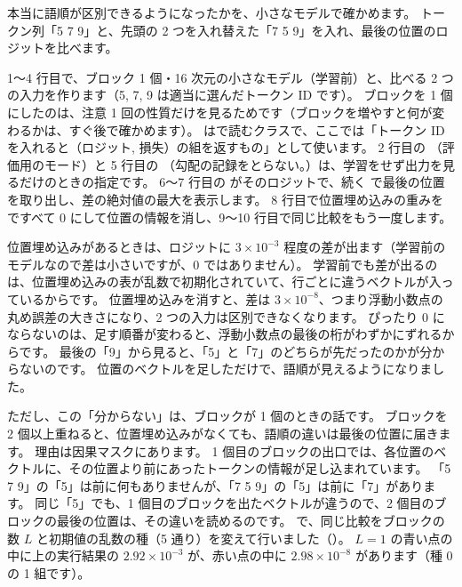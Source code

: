 本当に語順が区別できるようになったかを、小さなモデルで確かめます。
トークン列「5 7 9」と、先頭の 2 つを入れ替えた「7 5 9」を入れ、最後の位置のロジットを比べます。


1〜4 行目で、ブロック 1 個・16 次元の小さなモデル（学習前）と、比べる 2 つの入力を作ります（5, 7, 9 は適当に選んだトークン ID です）。
ブロックを 1 個にしたのは、注意 1 回の性質だけを見るためです（ブロックを増やすと何が変わるかは、すぐ後で確かめます）。
 はで読むクラスで、ここでは「トークン ID を入れると（ロジット, 損失）の組を返すもの」として使います。
2 行目の （評価用のモード）と 5 行目の （勾配の記録をとらない。）は、学習をせず出力を見るだけのときの指定です。
6〜7 行目の  がそのロジットで、続く \code{[0, -1]} で最後の位置を取り出し、差の絶対値の最大を表示します。
8 行目で位置埋め込みの重みを  ですべて 0 にして位置の情報を消し、9〜10 行目で同じ比較をもう一度します。


位置埋め込みがあるときは、ロジットに $3\times10^{-3}$ 程度の差が出ます（学習前のモデルなので差は小さいですが、0 ではありません）。
学習前でも差が出るのは、位置埋め込みの表が乱数で初期化されていて、行ごとに違うベクトルが入っているからです。
位置埋め込みを消すと、差は $3\times 10^{-8}$、つまり浮動小数点の丸め誤差の大きさになり、2 つの入力は区別できなくなります。
ぴったり 0 にならないのは、足す順番が変わると、浮動小数点の最後の桁がわずかにずれるからです。
最後の「9」から見ると、「5」と「7」のどちらが先だったのかが分からないのです。
位置のベクトルを足しただけで、語順が見えるようになりました。

ただし、この「分からない」は、ブロックが 1 個のときの話です。
ブロックを 2 個以上重ねると、位置埋め込みがなくても、語順の違いは最後の位置に届きます。
理由は因果マスクにあります。
1 個目のブロックの出口では、各位置のベクトルに、その位置より前にあったトークンの情報が足し込まれています。
「5 7 9」の「5」は前に何もありませんが、「7 5 9」の「5」は前に「7」があります。
同じ「5」でも、1 個目のブロックを出たベクトルが違うので、2 個目のブロックの最後の位置は、その違いを読めるのです。
 で、同じ比較をブロックの数 $L$ と初期値の乱数の種（5 通り）を変えて行いました（）。
$L=1$ の青い点の中に上の実行結果の $2.92\times10^{-3}$ が、赤い点の中に $2.98\times10^{-8}$ があります（種 0 の 1 組です）。

